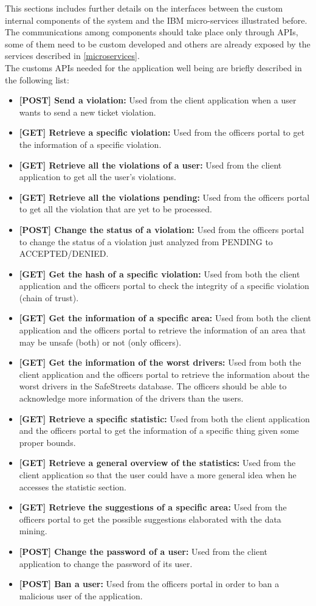 This sections includes further details on the interfaces between the custom internal components of the system and the IBM micro-services illustrated before. The communications among components should take place only through APIs, some of them need to be custom developed and others are already exposed by the services described in \ref{microservices}.
\\ The customs APIs needed for the application well being are briefly described in the following list:
\begin{itemize}
	\item \textbf{[POST] Send a violation:} Used from the client application when a user wants to send a new ticket violation.
	\item \textbf{[GET] Retrieve a specific violation:} Used from the officers portal to get the information of a specific violation.
	\item \textbf{[GET] Retrieve all the violations of a user:} Used from the client application to get all the user's violations.
	\item \textbf{[GET] Retrieve all the violations pending:} Used from the officers portal to get all the violation that are yet to be processed.
	\item \textbf{[POST] Change the status of a violation:} Used from the officers portal to change the status of a violation just analyzed from PENDING to ACCEPTED/DENIED.
	\item \textbf{[GET] Get the hash of a specific violation:}  Used from both the client application and the officers portal to check the integrity of a specific violation (chain of trust). 
	\item \textbf{[GET] Get the information of a specific area:} Used from both the client application and the officers portal to retrieve the information of an area that may be unsafe (both) or not (only officers).
	\item \textbf{[GET] Get the information of the worst drivers:} Used from both the client application and the officers portal to retrieve the information about the worst drivers in the SafeStreets database. The officers should be able to acknowledge more information of the drivers than the users.
	\item \textbf{[GET] Retrieve a specific statistic:} Used from both the client application and the officers portal to get the information of a specific thing given some proper bounds.
	\item \textbf{[GET] Retrieve a general overview of the statistics:} Used from the client application so that the user could have a more general idea when he accesses the statistic section.
	\item \textbf{[GET] Retrieve the suggestions of a specific area:} Used from the officers portal to get the possible suggestions elaborated with the data mining.
	\item \textbf{[POST] Change the password of a user:} Used from the client application to change the password of its user.
	\item \textbf{[POST] Ban a user:} Used from the officers portal in order to ban a malicious user of the application.
\end{itemize}
